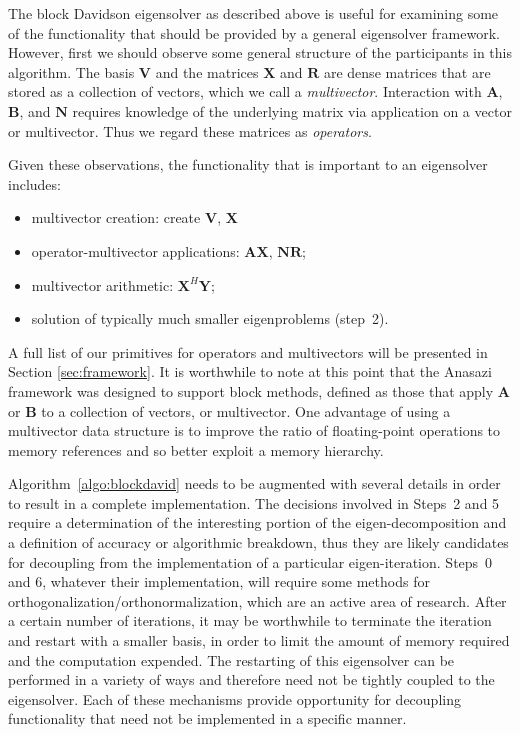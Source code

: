 \documentclass[acmtoms]{acmtrans2m}
\newcounter{algorithm}
\begin{document}
The block Davidson eigensolver as described above is useful for examining some of the
functionality that should be provided by a general eigensolver framework. However, first
we should observe some general structure of the participants in this algorithm. The basis
$\mathbf{V}$ and the matrices $\mathbf{X}$ and $\mathbf{R}$ are dense matrices that are
stored as a collection of vectors, which we call a \emph{multivector}. Interaction with
$\mathbf{A}$, $\mathbf{B}$, and $\mathbf{N}$ requires knowledge of the underlying matrix
via application on a vector or multivector. Thus we regard these matrices as
\emph{operators}.

Given these observations, the functionality that is important to an eigensolver includes:
\begin{itemize}
  \item multivector creation: create $\mathbf{V}$, $\mathbf{X}$
  \item operator-multivector applications: $\mathbf{A} \mathbf{X}$, $\mathbf{N R}$;
  \item multivector arithmetic: $\mathbf{X}^H \mathbf{Y}$;
  \item solution of typically much smaller eigenproblems (step~2).
\end{itemize}
A full list of our primitives for operators and multivectors will be presented in Section \ref{sec:framework}. 
It is worthwhile to note at this point that the Anasazi framework was designed to support block methods,
defined as those that apply $\mathbf{A}$ or $\mathbf{B}$ to a collection of vectors, or multivector.
One advantage of using a multivector data structure is to improve the ratio of 
floating-point operations to memory references and so better exploit a memory hierarchy.

Algorithm~\ref{algo:blockdavid} needs to be augmented with several details in order to
result in a complete implementation. The decisions involved in Steps~2 and 5 require a
determination of the interesting portion of the eigen-decomposition and a definition of
accuracy or algorithmic breakdown, thus they are likely candidates for decoupling from the
implementation of a particular eigen-iteration. Steps~0 and 6, whatever their
implementation, will require some methods for orthogonalization/orthonormalization, which
are an active area of research. After a certain number of iterations, it may be worthwhile
to terminate the iteration and restart with a smaller basis, in order to limit the amount
of memory required and the computation expended. The restarting of this eigensolver can be
performed in a variety of ways and therefore need not be tightly coupled to the
eigensolver. Each of these mechanisms provide opportunity for decoupling functionality
that need not be implemented in a specific manner. 
\end{document}
